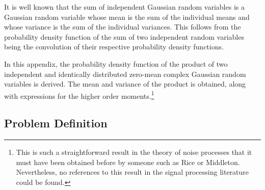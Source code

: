 It is well known that the sum of independent Gaussian random variables 
is a Gaussian random variable whose mean is the sum of the individual means
and whose variance is the sum of the individual variances.
This follows from the probability density function of the sum of two 
independent random variables being the convolution of their respective
probability density functions. 

In this appendix, the probability density function of the product of two
independent and identically distributed zero-mean complex Gaussian random
variables is derived.  The mean and variance of the product is obtained,
along with expressions for the higher order moments.\footnote{This is such a
straightforward result in the theory of noise processes that it must have
been obtained before by someone such as Rice or Middleton.  Nevertheless, no
references to this result in the signal processing literature could be
found.}

\subsection{Problem Definition}

